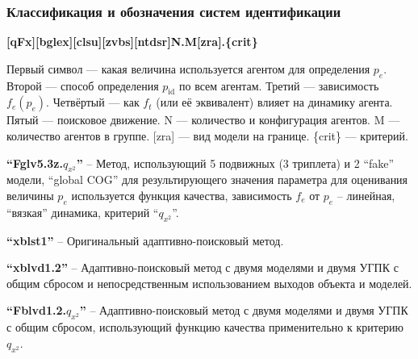 \documentclass[10pt,utf8]{beamer}
\begin{document}
\begin{frame}
  \frametitle{Классификация и обозначения систем идентификации}

  \begin{center}
    \textbf{[qFx][bglex][clsu][zvbs][ntdsr]N.M[zra].\{crit\}}
  \end{center}

  Первый символ --- какая величина используется агентом для определения $p_e$.
  Второй --- способ определения $p_\mathrm{id}$ по всем агентам.
  Третий --- зависимость $f_e(p_e)$.
  Четвёртый --- как $f_t$ (или её эквивалент) влияет на динамику агента.
  Пятый --- поисковое движение.
  N --- количество и конфигурация агентов.
  M --- количество агентов в группе.
  [zra] --- вид модели на границе.
  \{crit\} --- критерий.

  \textbf{``Fglv5.3z.$q_{x^2}$''} -- Метод, использующий 5 подвижных (3 триплета) и 2 ``fake'' модели,
  ``global COG'' для результирующего значения параметра
  для оценивания величины $p_e$ используется функция качества,
  зависимость $f_e$ от $p_e$ -- линейная, ``вязкая'' динамика, критерий ``$q_{x^2}$''.

  \textbf{``xblst1''} -- Оригинальный адаптивно-поисковый метод.

  \textbf{``xblvd1.2''} -- Адаптивно-поисковый метод с двумя моделями и двумя УГПК с общим сбросом
    и непосредственным использованием выходов объекта и моделей.

  \textbf{``Fblvd1.2.$q_{x^2}$''} -- Адаптивно-поисковый метод с двумя моделями и двумя УГПК с общим сбросом,
   использующий функцию качества применительно к критерию $q_{x^2}$.
\end{frame}




\end{document}

